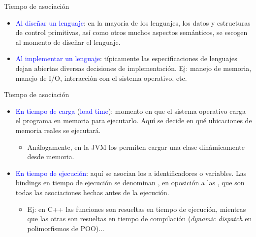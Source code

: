 \documentclass{beamer} %
\newcommand{\blue}[1]{\textcolor{blue}{#1}}
\newcommand{\redb}[1]{{\color{red!70!black}{#1}}}
\begin{document}
\begin{frame}{Tiempo de asociación}
    \begin{itemize}
        \item<1-> \blue{Al diseñar un lenguaje}: en la mayoría de los lenguajes, los datos y estructuras de control primitivas, así como otros muchos aspectos semánticos, se escogen al momento de diseñar el lenguaje.
        \item<2-> \blue{Al implementar un lenguaje}: típicamente las especificaciones de lenguajes dejan abiertas diversas decisiones de implementación. Ej: manejo de memoria, manejo de I/O, interacción con el sistema operativo, etc.
    \end{itemize}
\end{frame}

\begin{frame}{Tiempo de asociación}
    \begin{itemize}
        \item<1-> \blue{En tiempo de carga} (\blue{load time}): momento en que el sistema operativo carga el programa en memoria para ejecutarlo. Aquí se decide en qué ubicaciones de memoria reales se ejecutará.
        \begin{itemize}
            \item<2-> Análogamente, en la JVM los \redb{classloaders} permiten cargar una clase dinámicamente desde memoria.
        \end{itemize}
        \item<3-> \blue{En tiempo de ejecución}: aquí se asocian los \redb{valores} a identificadores o variables. Las bindings en tiempo de ejecución se denominan \redb{dinámicas}, en oposición a las \redb{estáticas}, que son todas las asociaciones hechas antes de la ejecución.
        \begin{itemize}
            \item<4-> Ej: en C++ las funciones \redb{virtual} son resueltas en tiempo de ejecución, mientras que las otras son resueltas en tiempo de compilación ({\em dynamic dispatch} en polimorfismos de POO)...
        \end{itemize}
    \end{itemize}
\end{frame}
\end{document}
